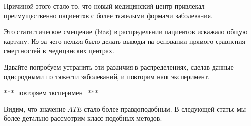 \documentclass{article}
\begin{document}
        Причиной этого стало то, что новый медицинский центр привлекал преимущественно пациентов с более тяжёлыми формами заболевания.

        Это статистическое смещение (bias) в распределении пациентов искажало общую картину. Из-за чего нельзя было делать выводы на основании прямого сравнения смертностей в медицинских центрах.

        Давайте попробуем устранить эти различия в распределениях, сделав данные однородными по тяжести заболеваний, и повторим наш эксперимент.

        *** повторяем эксперимент ***

        Видим, что значение $ATE$ стало более правдоподобным. В следующей статье мы более детально рассмотрим класс подобных методов.
\end{document}
